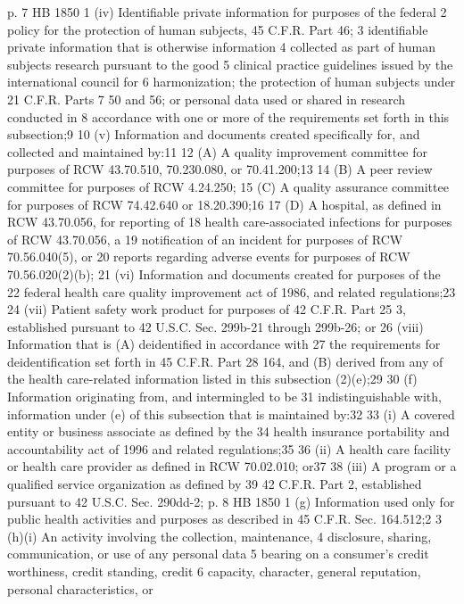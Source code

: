 p. 7 HB 1850
1 (iv) Identifiable private information for purposes of the federal
2 policy for the protection of human subjects, 45 C.F.R. Part 46;
3 identifiable private information that is otherwise information
4 collected as part of human subjects research pursuant to the good
5 clinical practice guidelines issued by the international council for
6 harmonization; the protection of human subjects under 21 C.F.R. Parts
7 50 and 56; or personal data used or shared in research conducted in
8 accordance with one or more of the requirements set forth in this
subsection;9
10 (v) Information and documents created specifically for, and
collected and maintained by:11
12 (A) A quality improvement committee for purposes of RCW
43.70.510, 70.230.080, or 70.41.200;13
14 (B) A peer review committee for purposes of RCW 4.24.250;
15 (C) A quality assurance committee for purposes of RCW 74.42.640
or 18.20.390;16
17 (D) A hospital, as defined in RCW 43.70.056, for reporting of
18 health care-associated infections for purposes of RCW 43.70.056, a
19 notification of an incident for purposes of RCW 70.56.040(5), or
20 reports regarding adverse events for purposes of RCW 70.56.020(2)(b);
21 (vi) Information and documents created for purposes of the
22 federal health care quality improvement act of 1986, and related
regulations;23
24 (vii) Patient safety work product for purposes of 42 C.F.R. Part
25 3, established pursuant to 42 U.S.C. Sec. 299b-21 through 299b-26; or
26 (viii) Information that is (A) deidentified in accordance with
27 the requirements for deidentification set forth in 45 C.F.R. Part
28 164, and (B) derived from any of the health care-related information
listed in this subsection (2)(e);29
30 (f) Information originating from, and intermingled to be
31 indistinguishable with, information under (e) of this subsection that
is maintained by:32
33 (i) A covered entity or business associate as defined by the
34 health insurance portability and accountability act of 1996 and
related regulations;35
36 (ii) A health care facility or health care provider as defined in
RCW 70.02.010; or37
38 (iii) A program or a qualified service organization as defined by
39 42 C.F.R. Part 2, established pursuant to 42 U.S.C. Sec. 290dd-2;
p. 8 HB 1850
1 (g) Information used only for public health activities and
purposes as described in 45 C.F.R. Sec. 164.512;2
3 (h)(i) An activity involving the collection, maintenance,
4 disclosure, sharing, communication, or use of any personal data
5 bearing on a consumer's credit worthiness, credit standing, credit
6 capacity, character, general reputation, personal characteristics, or

